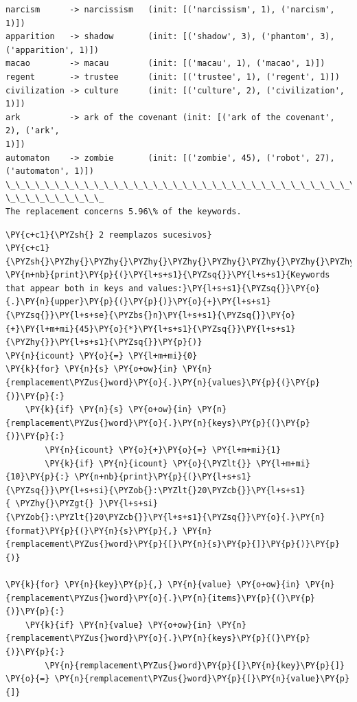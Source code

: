     \begin{Verbatim}[commandchars=\\\{\}]
narcism      -> narcissism   (init: [('narcissism', 1), ('narcism', 1)])
apparition   -> shadow       (init: [('shadow', 3), ('phantom', 3),
('apparition', 1)])
macao        -> macau        (init: [('macau', 1), ('macao', 1)])
regent       -> trustee      (init: [('trustee', 1), ('regent', 1)])
civilization -> culture      (init: [('culture', 2), ('civilization', 1)])
ark          -> ark of the covenant (init: [('ark of the covenant', 2), ('ark',
1)])
automaton    -> zombie       (init: [('zombie', 45), ('robot', 27),
('automaton', 1)])
\_\_\_\_\_\_\_\_\_\_\_\_\_\_\_\_\_\_\_\_\_\_\_\_\_\_\_\_\_\_\_\_\_\_\_\_\_\_\_\_\_\_\_\_\_\_\_\_\_\_\_\_\_\_\_\_\_\_\_\_\_\_\_\_\_\_\_\_\_\_\_\_\_\_\_\_\_\_\_\_
\_\_\_\_\_\_\_\_\_\_
The replacement concerns 5.96\% of the keywords.
\end{Verbatim}

    \begin{tcolorbox}[breakable, size=fbox, boxrule=1pt, pad at break*=1mm,colback=cellbackground, colframe=cellborder]
\begin{Verbatim}[commandchars=\\\{\}]
\PY{c+c1}{\PYZsh{} 2 reemplazos sucesivos}
\PY{c+c1}{\PYZsh{}\PYZhy{}\PYZhy{}\PYZhy{}\PYZhy{}\PYZhy{}\PYZhy{}\PYZhy{}\PYZhy{}\PYZhy{}\PYZhy{}\PYZhy{}\PYZhy{}\PYZhy{}\PYZhy{}\PYZhy{}\PYZhy{}\PYZhy{}\PYZhy{}\PYZhy{}\PYZhy{}\PYZhy{}\PYZhy{}\PYZhy{}\PYZhy{}\PYZhy{}\PYZhy{}\PYZhy{}}
\PY{n+nb}{print}\PY{p}{(}\PY{l+s+s1}{\PYZsq{}}\PY{l+s+s1}{Keywords that appear both in keys and values:}\PY{l+s+s1}{\PYZsq{}}\PY{o}{.}\PY{n}{upper}\PY{p}{(}\PY{p}{)}\PY{o}{+}\PY{l+s+s1}{\PYZsq{}}\PY{l+s+se}{\PYZbs{}n}\PY{l+s+s1}{\PYZsq{}}\PY{o}{+}\PY{l+m+mi}{45}\PY{o}{*}\PY{l+s+s1}{\PYZsq{}}\PY{l+s+s1}{\PYZhy{}}\PY{l+s+s1}{\PYZsq{}}\PY{p}{)}
\PY{n}{icount} \PY{o}{=} \PY{l+m+mi}{0}
\PY{k}{for} \PY{n}{s} \PY{o+ow}{in} \PY{n}{remplacement\PYZus{}word}\PY{o}{.}\PY{n}{values}\PY{p}{(}\PY{p}{)}\PY{p}{:}
    \PY{k}{if} \PY{n}{s} \PY{o+ow}{in} \PY{n}{remplacement\PYZus{}word}\PY{o}{.}\PY{n}{keys}\PY{p}{(}\PY{p}{)}\PY{p}{:}
        \PY{n}{icount} \PY{o}{+}\PY{o}{=} \PY{l+m+mi}{1}
        \PY{k}{if} \PY{n}{icount} \PY{o}{\PYZlt{}} \PY{l+m+mi}{10}\PY{p}{:} \PY{n+nb}{print}\PY{p}{(}\PY{l+s+s1}{\PYZsq{}}\PY{l+s+si}{\PYZob{}:\PYZlt{}20\PYZcb{}}\PY{l+s+s1}{ \PYZhy{}\PYZgt{} }\PY{l+s+si}{\PYZob{}:\PYZlt{}20\PYZcb{}}\PY{l+s+s1}{\PYZsq{}}\PY{o}{.}\PY{n}{format}\PY{p}{(}\PY{n}{s}\PY{p}{,} \PY{n}{remplacement\PYZus{}word}\PY{p}{[}\PY{n}{s}\PY{p}{]}\PY{p}{)}\PY{p}{)}

\PY{k}{for} \PY{n}{key}\PY{p}{,} \PY{n}{value} \PY{o+ow}{in} \PY{n}{remplacement\PYZus{}word}\PY{o}{.}\PY{n}{items}\PY{p}{(}\PY{p}{)}\PY{p}{:}
    \PY{k}{if} \PY{n}{value} \PY{o+ow}{in} \PY{n}{remplacement\PYZus{}word}\PY{o}{.}\PY{n}{keys}\PY{p}{(}\PY{p}{)}\PY{p}{:}
        \PY{n}{remplacement\PYZus{}word}\PY{p}{[}\PY{n}{key}\PY{p}{]} \PY{o}{=} \PY{n}{remplacement\PYZus{}word}\PY{p}{[}\PY{n}{value}\PY{p}{]}                    
\end{Verbatim}
\end{tcolorbox}

